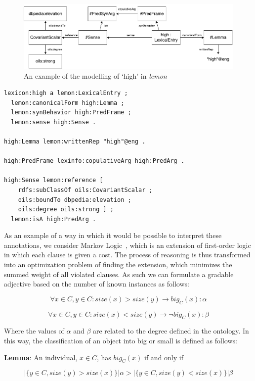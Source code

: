 \documentclass[11pt]{article}
\begin{document}
\begin{figure}
\includegraphics[width=\textwidth]{high-example}
\caption{An example of the modelling of `high' in \emph{lemon}\label{high-example}}
\end{figure}

\begin{verbatim}
lexicon:high a lemon:LexicalEntry ;
  lemon:canonicalForm high:Lemma ;
  lemon:synBehavior high:PredFrame ;
  lemon:sense high:Sense .

high:Lemma lemon:writtenRep "high"@eng .

high:PredFrame lexinfo:copulativeArg high:PredArg .

high:Sense lemon:reference [
    rdfs:subClassOf oils:CovariantScalar ;
    oils:boundTo dbpedia:elevation ;
    oils:degree oils:strong ] ;
  lemon:isA high:PredArg .
\end{verbatim}

As an example of a way in which it would be possible to interpret these 
annotations, we consider Markov Logic~\cite{richardson2006markov}, which is an 
extension of first-order logic in which each clause is given a cost. The process 
of reasoning is thus transformed into an optimization problem of finding the 
extension, which minimizes the summed weight of all violated clauses. As such we
can formulate a gradable adjective based on the number of known instances as 
follows:

$$\forall x \in C, y \in C : size(x) > size(y) \rightarrow big_C(x) : \alpha$$

$$\forall x \in C, y \in C : size(x) < size(y) \rightarrow \neg big_C(x) : \beta$$

Where the values of $\alpha$ and $\beta$ are related to the degree defined
in the ontology.
In this way, the classification of an object into big or small is defined as follows:

\noindent\textbf{Lemma}: An individual, $x \in C$, has $big_C(x)$ if and only if 

$$|\{y \in C, size(y) > size(x)\}| \alpha > |\{y \in C, size(y) < size(x)\}| \beta$$
\end{document}
